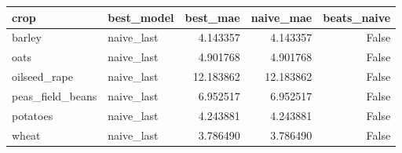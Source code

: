 \begin{tabular}{llrrr}
\toprule
crop & best\_model & best\_mae & naive\_mae & beats\_naive \\
\midrule
barley & naive\_last & 4.143357 & 4.143357 & False \\
oats & naive\_last & 4.901768 & 4.901768 & False \\
oilseed\_rape & naive\_last & 12.183862 & 12.183862 & False \\
peas\_field\_beans & naive\_last & 6.952517 & 6.952517 & False \\
potatoes & naive\_last & 4.243881 & 4.243881 & False \\
wheat & naive\_last & 3.786490 & 3.786490 & False \\
\bottomrule
\end{tabular}

